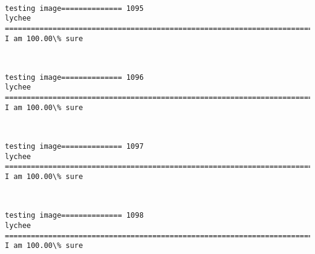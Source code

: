 \documentclass[11pt]{article}
\begin{document}
    \begin{center}
    \end{center}
    { \hspace*{\fill} \\}
    
    \begin{Verbatim}[commandchars=\\\{\}]
testing image============== 1095
lychee
============================================================================
I am 100.00\% sure

    \end{Verbatim}

    \begin{center}
    \end{center}
    { \hspace*{\fill} \\}
    
    \begin{Verbatim}[commandchars=\\\{\}]
testing image============== 1096
lychee
============================================================================
I am 100.00\% sure

    \end{Verbatim}

    \begin{center}
    \end{center}
    { \hspace*{\fill} \\}
    
    \begin{Verbatim}[commandchars=\\\{\}]
testing image============== 1097
lychee
============================================================================
I am 100.00\% sure

    \end{Verbatim}

    \begin{center}
    \end{center}
    { \hspace*{\fill} \\}
    
    \begin{Verbatim}[commandchars=\\\{\}]
testing image============== 1098
lychee
============================================================================
I am 100.00\% sure

    \end{Verbatim}
\end{document}
